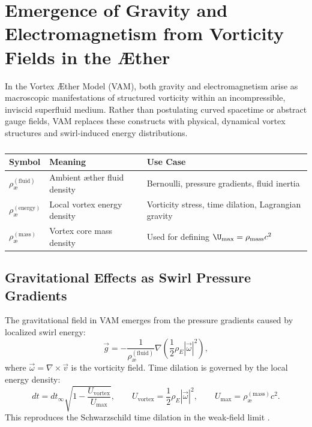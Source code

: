 \section{Emergence of Gravity and Electromagnetism from Vorticity Fields in the Æther}

In the Vortex \AE ther Model (VAM), both gravity and electromagnetism arise as macroscopic manifestations of structured vorticity within an incompressible, inviscid superfluid medium. Rather than postulating curved spacetime or abstract gauge fields, VAM replaces these constructs with physical, dynamical vortex structures and swirl-induced energy distributions.


\begin{table}
    \centering
    \begin{tabular}{lll}
        \toprule
        \textbf{Symbol} & \textbf{Meaning} & \textbf{Use Case} \\
        \midrule
          \(\rho_\text{\ae}^{(\text{fluid})}\) & Ambient æther fluid density & Bernoulli, pressure gradients, fluid inertia \\
          \(\rho_\text{\ae}^{(\text{energy})}\) & Local vortex energy density & Vorticity stress, time dilation, Lagrangian gravity \\
          \(\rho_\text{\ae}^{(\text{mass})}\) & Vortex core mass density & Used for defining \(\U_{\text{max}} = \rho_\text{mass} c^2\) \\
        \bottomrule
    \end{tabular}
    \caption{}
    \label{tab:densities}
\end{table}

\subsection{Gravitational Effects as Swirl Pressure Gradients}

The gravitational field in VAM emerges from the pressure gradients caused by localized swirl energy:
\begin{equation}
\vec{g} = -\frac{1}{\rho_\text{\ae}^{(\text{fluid})}} \nabla \left( \frac{1}{2} \rho_{\scriptscriptstyle\boldsymbol\!E}|\vec{\omega}|^2 \right),
\end{equation}
where \( \vec{\omega} = \nabla \times \vec{v} \) is the vorticity field. Time dilation is governed by the local energy density:
\begin{equation}
dt = dt_\infty \sqrt{1 - \frac{U_{\text{vortex}}}{U_{\text{max}}}}, \qquad
U_{\text{vortex}} = \frac{1}{2} \rho_{\scriptscriptstyle\boldsymbol\!E}|\vec{\omega}|^2, \qquad
U_{\text{max}} = \rho_\text{\ae}^{(\text{mass})} c^2.
\end{equation}
This reproduces the Schwarzschild time dilation in the weak-field limit \cite{MTW1973}.

